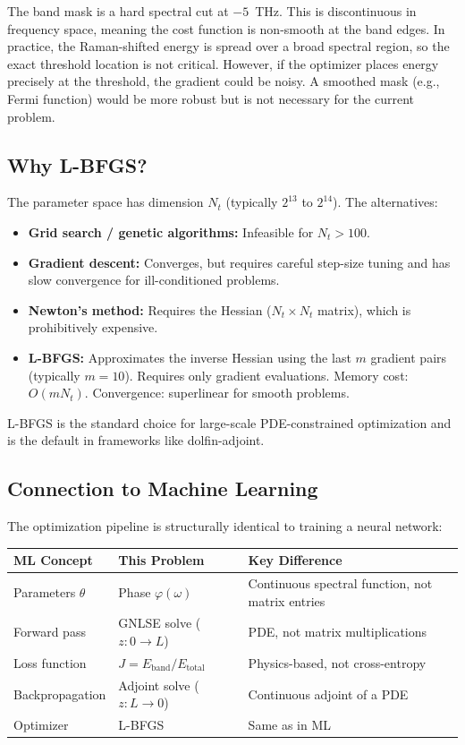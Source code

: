 \documentclass[12pt,a4paper]{article}
\theoremstyle{definition}
\begin{document}
\begin{advisory}
The band mask is a hard spectral cut at $-5$~THz. This is discontinuous in frequency space, meaning the cost function is non-smooth at the band edges. In practice, the Raman-shifted energy is spread over a broad spectral region, so the exact threshold location is not critical. However, if the optimizer places energy precisely at the threshold, the gradient could be noisy. A smoothed mask (e.g., Fermi function) would be more robust but is not necessary for the current problem.
\end{advisory}

\subsection{Why L-BFGS?}

The parameter space has dimension $N_t$ (typically $2^{13}$ to $2^{14}$). The alternatives:
\begin{itemize}[leftmargin=*]
\item \textbf{Grid search / genetic algorithms:} Infeasible for $N_t > 100$.
\item \textbf{Gradient descent:} Converges, but requires careful step-size tuning and has slow convergence for ill-conditioned problems.
\item \textbf{Newton's method:} Requires the Hessian ($N_t \times N_t$ matrix), which is prohibitively expensive.
\item \textbf{L-BFGS:} Approximates the inverse Hessian using the last $m$ gradient pairs (typically $m=10$). Requires only gradient evaluations. Memory cost: $O(mN_t)$. Convergence: superlinear for smooth problems.
\end{itemize}

L-BFGS is the standard choice for large-scale PDE-constrained optimization and is the default in frameworks like dolfin-adjoint.

\subsection{Connection to Machine Learning}

The optimization pipeline is structurally identical to training a neural network:
\begin{center}
\begin{tabular}{lll}
\toprule
ML Concept & This Problem & Key Difference \\
\midrule
Parameters $\theta$ & Phase $\varphi(\omega)$ & Continuous spectral function, not matrix entries \\
Forward pass & GNLSE solve ($z: 0 \to L$) & PDE, not matrix multiplications \\
Loss function & $J = E_{\text{band}}/E_{\text{total}}$ & Physics-based, not cross-entropy \\
Backpropagation & Adjoint solve ($z: L \to 0$) & Continuous adjoint of a PDE \\
Optimizer & L-BFGS & Same as in ML \\
\bottomrule
\end{tabular}
\end{center}
\end{document}
